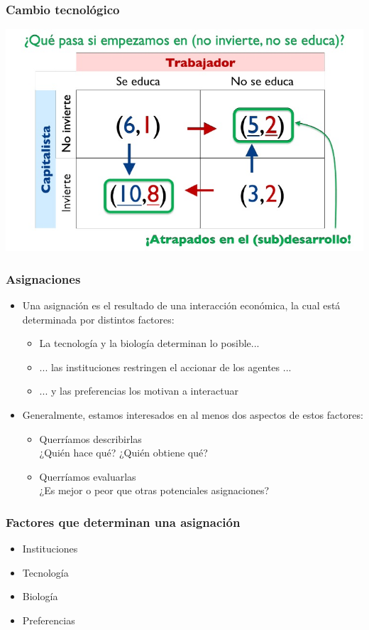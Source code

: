 \documentclass{beamer}
\begin{document}
\begin{frame}
\frametitle{Cambio tecnológico}
\centering
\includegraphics[scale=0.6]{Figures/Tema_03_34_catecno.jpg}
\end{frame}

\begin{frame}
\frametitle{Asignaciones}
\begin{itemize}
    \item Una asignación es el resultado de una interacción económica, la cual está determinada por distintos factores:
    \begin{itemize}
        \item La tecnología y la biología determinan lo posible...
        \item ... las instituciones restringen el accionar de los agentes ...
        \item ... y las preferencias los motivan a interactuar
    \end{itemize}
    \item Generalmente, estamos interesados en al menos dos aspectos de estos factores:
    \begin{itemize}
        \item Querríamos describirlas \\
        ¿Quién hace qué? ¿Quién obtiene qué?
        \item Querríamos evaluarlas \\ 
        ¿Es mejor o peor que otras potenciales asignaciones?
    \end{itemize}
\end{itemize} 
\end{frame}

\begin{frame}
\frametitle{ Factores que determinan una asignación}
\begin{itemize}
    \item Instituciones
    \item \textcolor{Azul}{Tecnología}
    \item \textcolor{Azul}{Biología}
    \item \textcolor{Azul}{Preferencias}
\end{itemize} 
\end{frame}
\end{document}
